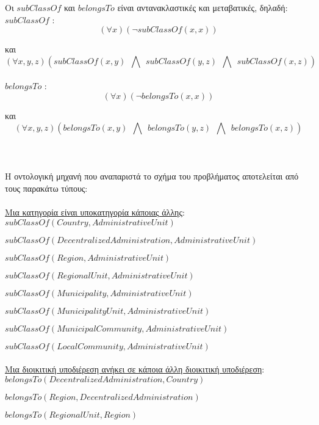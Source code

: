 \documentclass[10pt]{article}
\begin{document}
Οι $subClassOf$ και $belongsTo$ είναι αντανακλαστικές και μεταβατικές, δηλαδή: \\

\hspace{5mm}  $subClassOf$ :
\[
(\forall x)(\neg subClassOf(x,x))
\]

\hspace{80mm} και
\[
(\forall x,y,z)\left( subClassOf(x,y) \ \ \bigwedge \ \ subClassOf(y,z) \ \ \bigwedge \ \ subClassOf(x,z) \right )
\]
\\

\hspace{5mm}  $belongsTo$ :
\[
(\forall x)(\neg belongsTo(x,x))
\]

\hspace{80mm} και
\[
(\forall x,y,z)\left( belongsTo(x,y) \ \ \bigwedge \ \ belongsTo(y,z) \ \ \bigwedge \ \ belongsTo(x,z) \right )
\]
\\ \\ \\
Η οντολογική μηχανή που αναπαριστά το σχήμα του προβλήματος αποτελείται από τους παρακάτω τύπους:  \\ \\

\underline{Μια κατηγορία είναι υποκατηγορία κάποιας άλλης}: \\ 

$subClassOf(Country,AdministrativeUnit)$

$subClassOf(Decentralized Administration,AdministrativeUnit)$

$subClassOf(Region,AdministrativeUnit)$

$subClassOf(RegionalUnit,AdministrativeUnit)$

$subClassOf(Municipality,AdministrativeUnit)$

$subClassOf(MunicipalityUnit,AdministrativeUnit)$

$subClassOf(MunicipalCommunity,AdministrativeUnit)$

$subClassOf(LocalCommunity,AdministrativeUnit)$ \\ \\

\underline{Μια διοικιτική υποδιέρεση ανήκει σε κάποια άλλη διοικιτική υποδιέρεση}: \\

$belongsTo(Decentralized Administration, Country)$

$belongsTo(Region,Decentralized Administration)$

$belongsTo(RegionalUnit,Region)$
\end{document}
